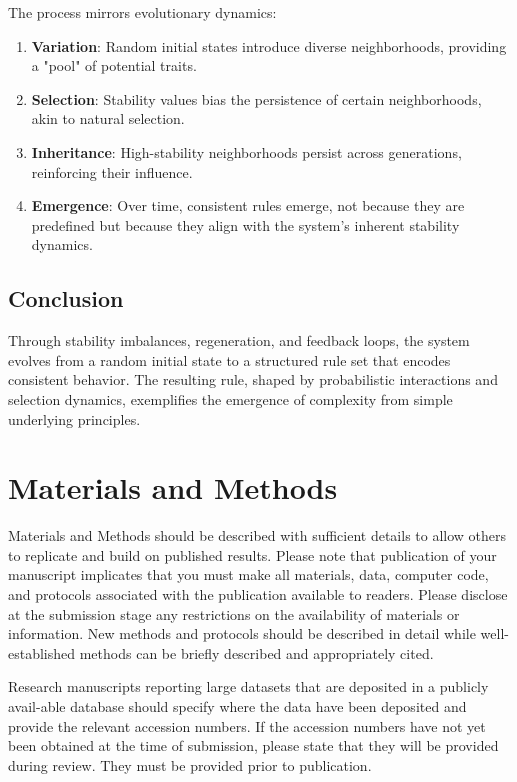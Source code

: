 \documentclass[entropy,article,submit,pdftex,moreauthors]{Definitions/mdpi}
\begin{document}
The process mirrors evolutionary dynamics:
\begin{enumerate}
    \item \textbf{Variation}: Random initial states introduce diverse neighborhoods, providing a "pool" of potential traits.
    \item \textbf{Selection}: Stability values bias the persistence of certain neighborhoods, akin to natural selection.
    \item \textbf{Inheritance}: High-stability neighborhoods persist across generations, reinforcing their influence.
    \item \textbf{Emergence}: Over time, consistent rules emerge, not because they are predefined but because they align with the system's inherent stability dynamics.
\end{enumerate}

\subsection{Conclusion}

Through stability imbalances, regeneration, and feedback loops, the system evolves from a random initial state to a structured rule set that encodes consistent behavior. The resulting rule, shaped by probabilistic interactions and selection dynamics, exemplifies the emergence of complexity from simple underlying principles.



\section{Materials and Methods}

Materials and Methods should be described with sufficient details to allow others to replicate and build on published results. Please note that publication of your manuscript implicates that you must make all materials, data, computer code, and protocols associated with the publication available to readers. Please disclose at the submission stage any restrictions on the availability of materials or information. New methods and protocols should be described in detail while well-established methods can be briefly described and appropriately cited.

Research manuscripts reporting large datasets that are deposited in a publicly avail-able database should specify where the data have been deposited and provide the relevant accession numbers. If the accession numbers have not yet been obtained at the time of submission, please state that they will be provided during review. They must be provided prior to publication.
\end{document}
